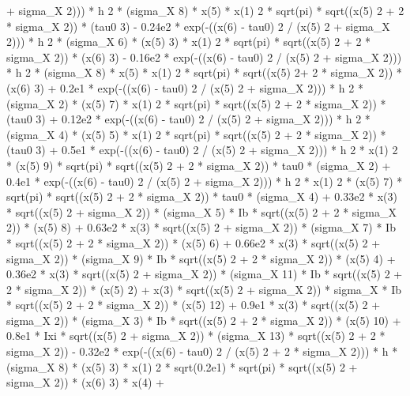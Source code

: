\begin{maplegroup}
+ sigma\_X  2))) * h  2 * (sigma\_X  8) * x(5) * x(1)  2 * sqrt(pi) * sqrt((x(5)  2 + 2 * sigma\_X  2)) * (tau0  3) - 0.24e2 * exp(-((x(6) - tau0)  2 / (x(5)  2 + sigma\_X  2))) * h  2 * (sigma\_X  6) * (x(5)  3) * x(1)  2 * sqrt(pi) * sqrt((x(5)  2 + 2 * sigma\_X  2)) * (x(6)  3) - 0.16e2 * exp(-((x(6) - tau0)  2 / (x(5)  2 + sigma\_X  2))) * h  2 * (sigma\_X  8) * x(5) * x(1)  2 * sqrt(pi) * sqrt((x(5)  2+ 2 * sigma\_X  2)) * (x(6)  3) + 0.2e1 * exp(-((x(6) - tau0)  2 / (x(5)  2 + sigma\_X  2))) * h  2 * (sigma\_X  2) * (x(5)  7) * x(1)  2 * sqrt(pi) * sqrt((x(5)  2 + 2 * sigma\_X  2)) * (tau0  3) + 0.12e2 * exp(-((x(6) - tau0)  2 / (x(5)  2 + sigma\_X  2))) * h  2 * (sigma\_X  4) * (x(5)  5) * x(1)  2 * sqrt(pi) * sqrt((x(5)  2 + 2 * sigma\_X  2)) * (tau0  3) + 0.5e1 * exp(-((x(6) - tau0)  2 / (x(5)  2 + sigma\_X  2))) * h  2 * x(1)  2 * (x(5)  9) * sqrt(pi) * sqrt((x(5)  2 + 2 * sigma\_X  2)) * tau0 * (sigma\_X  2) + 0.4e1 * exp(-((x(6) - tau0)  2 / (x(5)  2 + sigma\_X  2))) * h  2 * x(1)  2 * (x(5)  7) * sqrt(pi) * sqrt((x(5)  2 + 2 * sigma\_X  2)) * tau0 * (sigma\_X  4) + 0.33e2 * x(3) * sqrt((x(5)  2 + sigma\_X  2)) * (sigma\_X  5) * Ib * sqrt((x(5)  2 + 2 * sigma\_X  2)) * (x(5)  8) + 0.63e2 * x(3) * sqrt((x(5)  2 + sigma\_X  2)) * (sigma\_X  7) * Ib * sqrt((x(5)  2 + 2 * sigma\_X  2)) * (x(5)  6) + 0.66e2 * x(3) * sqrt((x(5)  2 + sigma\_X  2)) * (sigma\_X  9) * Ib * sqrt((x(5)  2 + 2 * sigma\_X  2)) * (x(5)  4) + 0.36e2 * x(3) * sqrt((x(5)  2 + sigma\_X  2)) * (sigma\_X  11) * Ib * sqrt((x(5)  2 + 2 * sigma\_X  2)) * (x(5)  2) + x(3) * sqrt((x(5)  2 + sigma\_X  2)) * sigma\_X * Ib * sqrt((x(5)  2 + 2 * sigma\_X  2)) * (x(5)  12) + 0.9e1 * x(3) * sqrt((x(5)  2 + sigma\_X  2)) * (sigma\_X  3) * Ib * sqrt((x(5)  2 + 2 * sigma\_X  2)) * (x(5)  10) + 0.8e1 * Ixi * sqrt((x(5)  2 + sigma\_X  2)) * (sigma\_X  13) * sqrt((x(5)  2 + 2 * sigma\_X  2)) - 0.32e2 * exp(-((x(6) - tau0)  2 / (x(5)  2 + 2 * sigma\_X  2))) * h * (sigma\_X  8) * (x(5)  3) * x(1)  2 * sqrt(0.2e1) * sqrt(pi) * sqrt((x(5)  2 + sigma\_X  2)) * (x(6)  3) * x(4) + 
\end{maplegroup}

